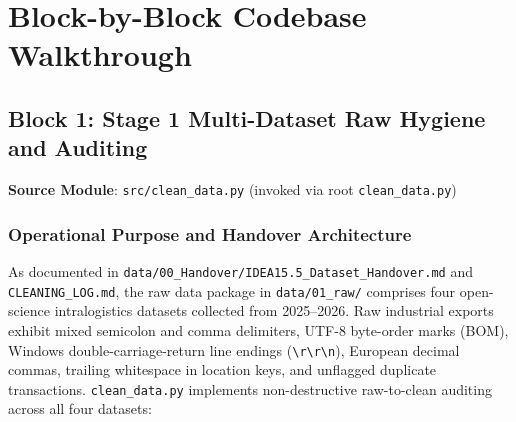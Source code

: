 \documentclass[11pt,a4paper]{article}
\begin{document}
\newpage
\section{Block-by-Block Codebase Walkthrough}

\subsection{Block 1: Stage 1 Multi-Dataset Raw Hygiene and Auditing}
\noindent\textbf{Source Module}: \texttt{src/clean\_data.py} (invoked via root \texttt{clean\_data.py})\\[0.5em]

\subsubsection{Operational Purpose and Handover Architecture}
As documented in \texttt{data/00\_Handover/IDEA15.5\_Dataset\_Handover.md} and \texttt{CLEANING\_LOG.md}, the raw data package in \texttt{data/01\_raw/} comprises four open-science intralogistics datasets collected from 2025--2026. Raw industrial exports exhibit mixed semicolon and comma delimiters, UTF-8 byte-order marks (BOM), Windows double-carriage-return line endings (\verb|\r\r\n|), European decimal commas, trailing whitespace in location keys, and unflagged duplicate transactions. \texttt{clean\_data.py} implements non-destructive raw-to-clean auditing across all four datasets:
\end{document}
